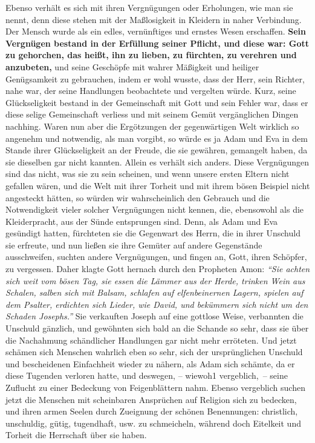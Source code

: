 Ebenso verhält es sich mit ihren Vergnügungen oder Erholungen,
wie man sie
nennt, denn diese stehen mit der
Maßlosigkeit in
Kleidern in naher
Verbindung. Der
Mensch wurde als ein edles, vernünftiges und ernstes Wesen erschaffen.
\textbf{Sein
Vergnügen bestand in der Erfüllung seiner Pflicht, und diese war: Gott zu
gehorchen, das heißt, ihn zu lieben, zu fürchten, zu verehren und anzubeten,}
und
seine Geschöpfe mit wahrer Mäßigkeit und heiliger Genügsamkeit zu gebrauchen,
indem er wohl wusste, dass der Herr, sein Richter, nahe war, der seine
Handlungen
beobachtete und vergelten würde. Kurz, seine Glückseligkeit bestand in der
Gemeinschaft mit Gott und sein Fehler war, dass er diese selige Gemeinschaft
verliess und mit seinem Gemüt vergänglichen Dingen nachhing. Waren nun aber
die Ergötzungen der gegenwärtigen Welt wirklich so angenehm und notwendig, als
man vorgibt, so würde es ja Adam und Eva in dem Stande ihrer Glückseligkeit an
der Freude, die sie gewähren, gemangelt haben, da sie dieselben gar nicht
kannten. Allein es verhält sich anders. Diese Vergnügungen sind das nicht, was
sie zu sein scheinen, und wenn unsere ersten Eltern nicht gefallen wären, und
die Welt mit ihrer Torheit und mit ihrem bösen Beispiel nicht angesteckt
hätten, so würden wir wahrscheinlich den Gebrauch und die Notwendigkeit vieler
solcher Vergnügungen nicht kennen, die, ebensowohl als die Kleiderpracht, aus
der Sünde entsprungen sind.  Denn, als Adam und Eva gesündigt
hatten, fürchteten
sie die Gegenwart des Herrn, die in ihrer Unschuld sie erfreute, und nun ließen
sie ihre Gemüter auf andere Gegenstände ausschweifen, suchten andere
Vergnügungen, und fingen an, Gott, ihren Schöpfer, zu vergessen. Daher klagte
Gott hernach durch den Propheten Amon:
\textit{"`Sie achten sich weit vom bösen Tag,
sie essen die Lämmer aus der Herde, trinken Wein aus Schalen, salben sich mit
Balsam, schlafen auf elfenbeinernen Lagern, spielen auf dem Psalter, erdichten
sich Lieder, wie David, und bekümmern sich nicht um den Schaden
Josephs."'}
Sie verkauften Joseph auf eine gottlose
Weise, verbannten die Unschuld gänzlich, und gewöhnten sich bald an die Schande
so sehr, dass sie über die Nachahmung schändlicher Handlungen gar nicht mehr
erröteten. Und jetzt schämen sich Menschen wahrlich eben so sehr, sich der
ursprünglichen Unschuld und bescheidenen Einfachheit wieder zu nähern, als Adam
sich schämte, da er diese Tugenden verloren hatte, und deswegen, -- wiewoh1
vergeblich,~-- seine Zuflucht zu einer Bedeckung von Feigenblättern nahm. Ebenso
vergeblich suchen jetzt die Menschen mit scheinbaren Ansprüchen auf Religion
sich zu bedecken, und ihren armen Seelen durch Zueignung der schönen
Benennungen: christlich, unschuldig, gütig, tugendhaft, usw. zu schmeicheln,
während doch Eitelkeit und Torheit die Herrschaft über sie haben.

